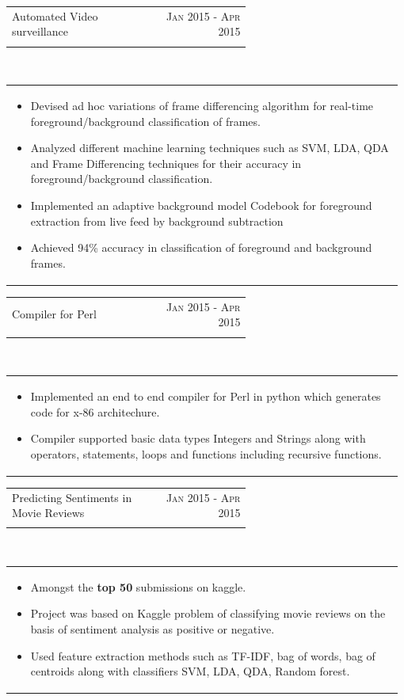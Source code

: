 \documentclass[a4paper]{article} %
\newcommand{\verticalspacing}{-0.05cm}
\newcommand{\bulletspace}{0.7cm}
\newcommand{\projectheadspacing}{6.9cm}
\newcommand{\cproject}[5]{%
    \begin{tabular}{p{0.60\linewidth}r}
        \textcolor{NavyBlue}{\small #2} & \multicolumn{1}{m{ \projectheadspacing{} }}{\raggedleft \small {\textsc{#1}}}\\
        \small {#3} & \small {#4}
    \end{tabular}\\
    \begin{tabular}{p{0.98\linewidth}}
    \vspace{-0.3cm}
        \small{#5}
    \end{tabular}
    \vspace{\verticalspacing{}}
}
\begin{document}
\cproject
    {Jan 2015 - Apr 2015 }
    {Automated Video surveillance}
    {\textsc{\raggedright Undergraduate project }, Prof. Harish Karnick}
    {}
    {%
        \begin{itemize}[leftmargin=\bulletspace{}]
            \item Devised ad hoc variations of frame differencing algorithm for real-time foreground/background classification of frames.
            \item  Analyzed different machine learning techniques such as SVM, LDA, QDA and Frame Differencing techniques for their accuracy in foreground/background classification.
            \item Implemented an adaptive background model Codebook for foreground extraction from live feed by background subtraction
            \item Achieved 94\% accuracy in classification of foreground and background frames.

        \end{itemize}
    }

\cproject
    {Jan 2015 - Apr 2015}
    {Compiler for Perl}
    {\textsc{\raggedright Compilers}, Prof. Subhajit Roy}
    {}
    {%
        \begin{itemize}[leftmargin=\bulletspace{}]
            \item Implemented an end to end compiler for Perl in python which generates code for x-86 architechure.
            \item Compiler supported basic data types Integers and Strings along with operators, statements, loops and functions including recursive functions.
        \end{itemize}
    }

\cproject
    {Jan 2015 - Apr 2015}
    {Predicting Sentiments in Movie Reviews}
    {\textsc{\raggedright Machine Learning}, Prof. Harish Karnick}
    {}
    {%
        \begin{itemize}[leftmargin=\bulletspace{}]
            \item Amongst the \textbf{top 50} submissions on kaggle.
            \item Project was based on Kaggle problem of classifying movie reviews on the basis of sentiment analysis as positive or negative.
            \item Used feature extraction methods such as TF-IDF, bag of words, bag of centroids along with classifiers SVM, LDA, QDA, Random forest.
            
        \end{itemize}
    }
\end{document}
